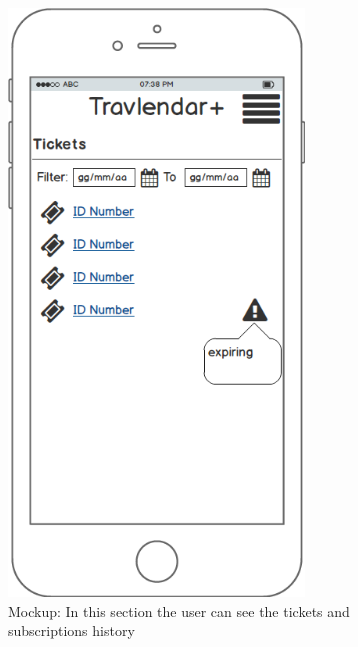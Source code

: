 \documentclass[numbers=noenddot, 12pt, a4paper, oneside]{scrbook}
\begin{document}
\begin{figure}[H]
	\centering
	\includegraphics[width=0.7\textwidth]{mockups/Tickets}
	\caption{Mockup: In this section the user can see the tickets and subscriptions history}
\end{figure}
\end{document}
